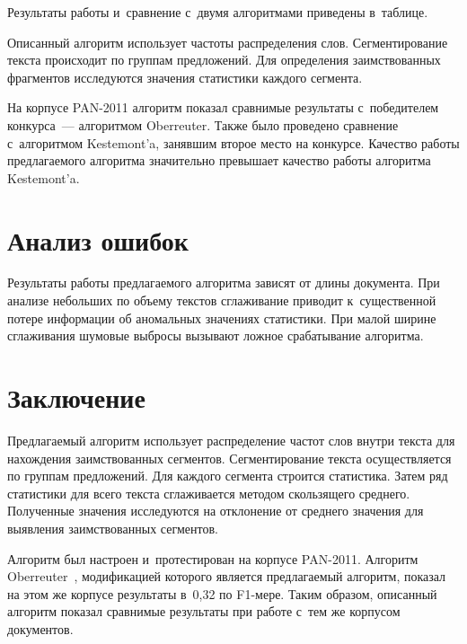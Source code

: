 \begin{multicols}{2}





Результаты работы и~сравнение с~двумя алгоритмами приведены в~таблице.



Описанный алгоритм использует частоты распределения слов. Сегментирование текста 
происходит по группам предложений. Для определения заимствованных фрагментов 
исследуются значения статистики каждого сегмента.

На корпусе PAN-2011 алгоритм показал сравнимые результаты с~победителем конкурса~--- 
алгоритмом Oberreuter. Также было проведено сравнение с~алгоритмом 
Kestemont'a, занявшим второе место на конкурсе. Качество работы предлагаемого 
алгоритма значительно превышает качество работы алгоритма Kestemont'a.


\section{Анализ ошибок}

Результаты работы предлагаемого алгоритма зави\-сят от длины документа. При 
анализе небольших по объему текстов сглаживание приводит к~существенной потере 
информации об аномальных значениях статистики. При малой ширине сглаживания 
шумовые выбросы вызывают ложное срабатывание алгоритма.

\vspace*{-14pt}

\section{Заключение}

Предлагаемый алгоритм использует распределение частот слов внутри текста для 
нахождения заимствованных сегментов. Сегментирование текста осуществляется по 
группам предложений. Для каждого сегмента строится статистика. Затем ряд 
статистики для всего текста  сглаживается методом скользящего среднего. 
Полученные значения исследуются на отклонение от среднего значения для выявления 
заимствованных сегментов.

Алгоритм был настроен и~протестирован на корпусе PAN-2011. Алгоритм 
Oberreuter~\cite{Chile}, модификацией которого является предлагаемый алгоритм, показал на 
этом же корпусе результаты в~0,32 по {F1-мере}. Таким образом, описанный 
алгоритм показал сравнимые результаты при работе с~тем же корпусом документов.


\end{multicols}
